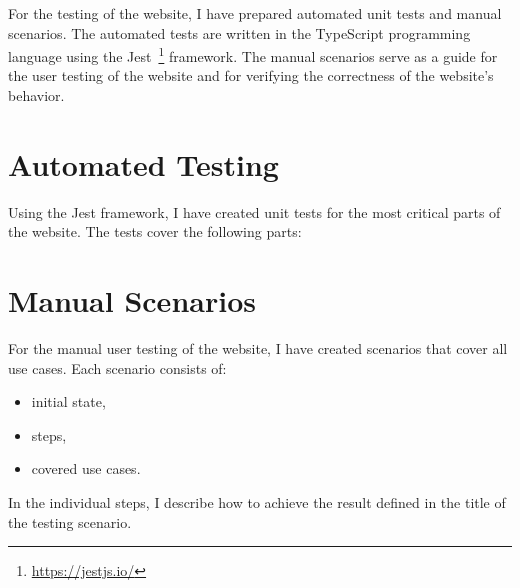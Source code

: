 For the testing of the website, I have prepared automated unit tests and manual scenarios.
The automated tests are written in the TypeScript programming language using the Jest~\footnote{\url{https://jestjs.io/}} framework.
The manual scenarios serve as a guide for the user testing of the website
and for verifying the correctness of the website's behavior.


\section{Automated Testing}
Using the Jest framework, I have created unit tests for the most critical parts of the website.
The tests cover the following parts:


\section{Manual Scenarios}
For the manual user testing of the website, I have created scenarios that cover all use cases.
Each scenario consists of:
\begin{itemize}
    \item initial state,
    \item steps,
    \item covered use cases.
\end{itemize}

In the individual steps, I describe how to achieve the result defined in the title of the testing scenario.

\newcommand{\testing}[2]{%
    \stepcounter{testingcounter}%
    \subsection{T\arabic{testingcounter} -- #1}
}




